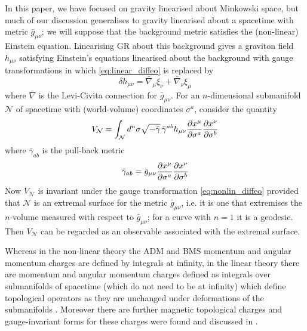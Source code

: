 In this paper, we have focused on gravity linearised about Minkowski space, but much of our discussion generalises to gravity linearised about a spacetime with metric $\bar{g}_{\mu \nu}$; we will suppose that the background metric satisfies the (non-linear) Einstein equation. Linearising GR about this background gives a graviton field $h_{\mu \nu}$ satisfying Einstein's equations linearised about the background with gauge transformations in which \eqref{eq:linear_diffeo} is replaced by 
\begin{equation}\label{eq:nonlin_diffeo}
    \delta h_{\mu \nu} = \bar{\nabla}_{\mu} \xi_{\nu} + \bar{\nabla}_{\nu} \xi_{\mu}
\end{equation}
where $\bar{\nabla}$ is the Levi-Civita connection for $\bar{g}_{\mu \nu}$.
For an $n$-dimensional submanifold $\mathcal{N}$ of spacetime with (world-volume) coordinates $\sigma^a$, consider the quantity
\begin{equation}
    V_{\mathcal{N}} = \int_{\mathcal{N}} d^n \sigma \sqrt{- \bar{\gamma}} \,\bar{\gamma}^{a b} h_{\mu \nu} \pdv{x^{\mu}}{\sigma^a} \pdv{x^{\nu}}{\sigma^b}
\end{equation}
where $\bar{\gamma}_{a b}$ is the pull-back metric
\begin{equation}
    \bar{\gamma}_{a b} = \bar{g}_{\mu \nu} \pdv{x^{\mu}}{\sigma^a} \pdv{x^{\nu}}{\sigma^b}
\end{equation}
Now $V_{\mathcal{N}}$ is invariant under the gauge transformation \eqref{eq:nonlin_diffeo} provided that $\mathcal{N}$ is an extremal surface for the metric $\bar{g}_{\mu \nu}$, i.e. it is one that extremises the $n$-volume measured with respect to $\bar{g}_{\mu \nu}$; for a curve with $n = 1$ it is a geodesic. Then $V_{\mathcal{N}}$ can be
regarded as an observable associated with the extremal surface.

Whereas in the non-linear theory the ADM and BMS momentum and angular momentum charges are defined by integrals at infinity, in the linear theory there are momentum and angular momentum charges defined as   integrals over submanifolds of spacetime (which do not need to be at infinity) which define topological operators as they are unchanged under deformations of the submanifolds \cite{Benedetti2023GeneralizedGravitons, Hinterbichler2023GravitySymmetries, Hull:2024xgo}. Moreover there are further magnetic topological charges \cite{HullYetAppear} and gauge-invariant forms for these charges were found and discussed in \cite{Hull:2024mfb,Hull:2024xgo}.


